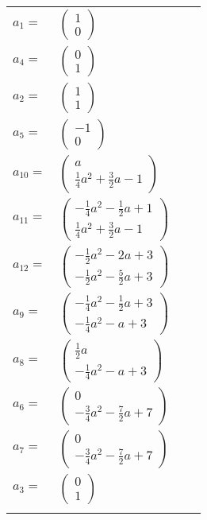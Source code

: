 \documentclass[1p]{elsarticle_modified}
\theoremstyle{definition}
\begin{document}
\begin{tabular}{m{7pt} m{180pt} m{7pt} m{180pt} }
\flushright $a_{1}=$&$\begin{pmatrix}1\\0\end{pmatrix}$ \\
\flushright $a_{4}=$&$\begin{pmatrix}0\\1\end{pmatrix}$ \\
\flushright $a_{2}=$&$\begin{pmatrix}1\\1\end{pmatrix}$ \\
\flushright $a_{5}=$&$\begin{pmatrix}-1\\0\end{pmatrix}$ \\
\flushright $a_{10}=$&$\begin{pmatrix}a\\\frac{1}{4} a^2+\frac{3}{2} a-1\end{pmatrix}$ \\
\flushright $a_{11}=$&$\begin{pmatrix}-\frac{1}{4} a^2-\frac{1}{2} a+1\\\frac{1}{4} a^2+\frac{3}{2} a-1\end{pmatrix}$ \\
\flushright $a_{12}=$&$\begin{pmatrix}-\frac{1}{2} a^2-2 a+3\\-\frac{1}{2} a^2-\frac{5}{2} a+3\end{pmatrix}$ \\
\flushright $a_{9}=$&$\begin{pmatrix}-\frac{1}{4} a^2-\frac{1}{2} a+3\\-\frac{1}{4} a^2- a+3\end{pmatrix}$ \\
\flushright $a_{8}=$&$\begin{pmatrix}\frac{1}{2} a\\-\frac{1}{4} a^2- a+3\end{pmatrix}$ \\
\flushright $a_{6}=$&$\begin{pmatrix}0\\-\frac{3}{4} a^2-\frac{7}{2} a+7\end{pmatrix}$ \\
\flushright $a_{7}=$&$\begin{pmatrix}0\\-\frac{3}{4} a^2-\frac{7}{2} a+7\end{pmatrix}$ \\
\flushright $a_{3}=$&$\begin{pmatrix}0\\1\end{pmatrix}$\\&\end{tabular}
\end{document}

